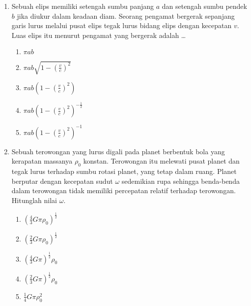 \documentclass[A4,12PT, english, twocolumn]{journal}
\begin{document}
\begin{enumerate}
\item Sebuah elips memiliki setengah sumbu panjang $a$ dan setengah sumbu pendek $b$ jika diukur dalam keadaan diam. Seorang pengamat bergerak sepanjang garis lurus melalui pusat elips tegak lurus bidang elips dengan kecepatan $v$. Luas elips itu menurut pengamat yang bergerak adalah \dots
    \begin{enumerate}
        \item $\pi ab$
        \item $\pi ab \sqrt{1- \left(\frac{v}{c} \right)^2}$
        \item $\pi ab \left(1- \left(\frac{v}{c} \right)^2 \right)$
        \item $\pi ab \left(1- \left(\frac{v}{c} \right)^2 \right)^{-\frac{1}{2}}$
        \item $\pi ab \left(1- \left(\frac{v}{c} \right)^2 \right)^{-1}$
    \end{enumerate}

\item Sebuah terowongan yang lurus digali pada planet berbentuk bola yang kerapatan massanya $\rho_0$ konstan. Terowongan itu melewati pusat planet dan tegak lurus terhadap sumbu rotasi planet, yang tetap dalam ruang. Planet berputar dengan kecepatan sudut $\omega$ sedemikian rupa sehingga benda-benda dalam terowongan tidak memiliki percepatan relatif terhadap terowongan. Hitunglah nilai $\omega$.
    \begin{enumerate}
        \item $\left( \frac{4}{3}G \pi \rho_0 \right)^{\frac{1}{2}}$
        \item $\left( \frac{2}{3}G \pi \rho_0 \right)^{\frac{1}{2}}$
        \item $\left( \frac{4}{3}G \pi \right)^{\frac{1}{2}} \rho_0$
        \item $\left( \frac{2}{3}G \pi \right)^{\frac{1}{2}} \rho_0$
        \item $\frac{1}{4}G \pi \rho_0^2$
    \end{enumerate}

\end{enumerate}
\end{document}
